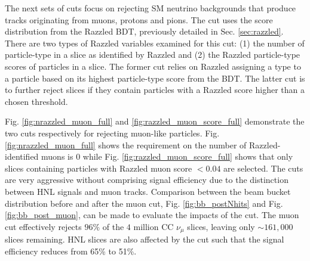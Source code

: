 The next sets of cuts focus on rejecting SM neutrino backgrounds that produce tracks originating from muons, protons and pions.
The cut uses the score distribution from the Razzled BDT, previously detailed in Sec. \ref{sec:razzled}.
There are two types of Razzled variables examined for this cut: (1) the number of particle-type in a slice as identified by Razzled and (2) the Razzled particle-type scores of particles in a slice.
The former cut relies on Razzled assigning a type to a particle based on its highest particle-type score from the BDT.
The latter cut is to further reject slices if they contain particles with a Razzled score higher than a chosen threshold.

Fig. \ref{fig:nrazzled_muon_full} and \ref{fig:razzled_muon_score_full} demonstrate the two cuts respectively for rejecting muon-like particles.
Fig. \ref{fig:nrazzled_muon_full} shows the requirement on the number of Razzled-identified muons is 0 while Fig. \ref{fig:razzled_muon_score_full} shows that only slices containing particles with Razzled muon score $< 0.04$ are selected.
The cuts are very aggressive without comprising signal efficiency due to the distinction between HNL signals and muon tracks.  
Comparison between the beam bucket distribution before and after the muon cut, Fig. \ref{fig:bb_postNhits} and Fig. \ref{fig:bb_post_muon}, can be made to evaluate the impacts of the cut.
The muon cut effectively rejects $96\%$ of the $4$ million CC $\nu_\mu$ slices, leaving only $\sim161,000$ slices remaining.
HNL slices are also affected by the cut such that the signal efficiency reduces from 65\% to 51\%.

